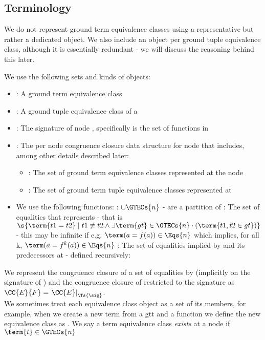 \subsection{Terminology}
We do not represent ground term equivalence classes using a representative but rather a dedicated object.
We also include an object per ground tuple equivalence class, although it is essentially redundant - we will discuss the reasoning behind this later.

We use the following sets and kinds of objects:
\begin{itemize}
	\item \GTEC : A ground term equivalence class
	\item \GTTEC : A ground tuple equivalence class
of a \GTTEC
	\item {} : The signature of node , specifically  is the set of functions in 
	\item {} : The per node congruence closure data structure for node  that includes, among other details described later:
	\begin{itemize}
		\item {} : The set of ground term equivalence classes represented at the node 
		\item {}: The set of ground term tuple equivalence classes represented at 
	\end{itemize}
	\item We use the following functions:
		\subitem {}: $\cup \GTECs{n}$ -  are a partition of 
		\subitem {} : The set of equalities that  represents - that is
		$\s{\term{t1=t2} \mid t1 \not\equiv t2 \land \exists \term{gt} \in \GTECs{n} \cdot (\term{t1,t2 \in gt})}$ -
		this may be infinite if e.g. $\term(a=f(a)) \in \Eqs{n}$ which implies, for all k, $\term(a=f^k(a)) \in \Eqs{n}$
		\subitem {} : The set of equalities implied by  and its predecessors at  -
		defined recursively: \\
\end{itemize}

We represent the congruence closure of a set of equalities  by  (implicitly on the signature of ) and the congruence closure of  restricted to the signature \sig as $\CC{E}{F}=\left.\CC{E}\right|_{\Ts{\sig}}$.\\
We sometimes treat each equivalence class object as a set of its members, for example, when we create a new term from a \GTTEC gtt and a function  we define the new equivalence class as .
We say a term equivalence class  \emph{exists} at a node  if $\term{t} \in \GTECs{n}$

